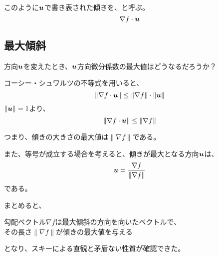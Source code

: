 \documentclass[../../../topic_calculus]{subfiles}
\begin{document}
\br

このように$\vb*{u}$で書き表された傾きを、と呼ぶ。
\begin{equation*}
  \nabla f \cdot \vb*{u}
\end{equation*}

\subsection{最大傾斜}

方向$\vb*{u}$を変えたとき、$\vb*{u}$方向微分係数の最大値はどうなるだろうか？

\br

コーシー・シュワルツの不等式を用いると、
\begin{equation*}
  \| \nabla f \cdot \vb*{u} \| \leq \| \nabla f \| \cdot \| \vb*{u} \|
\end{equation*}
$\| \vb*{u} \| = 1$より、
\begin{equation*}
  \| \nabla f \cdot \vb*{u} \| \leq \| \nabla f \|
\end{equation*}

\br

つまり、傾きの大きさの最大値は$\| \nabla f \|$である。

また、等号が成立する場合を考えると、傾きが最大となる方向$\vb*{u}$は、
\begin{equation*}
  \vb*{u} = \frac{\nabla f}{\| \nabla f \|}
\end{equation*}
である。

\br

まとめると、
\begin{emphabox}
  \begin{spacebox}
    \begin{center}
      勾配ベクトル$\nabla f$は最大傾斜の方向を向いたベクトルで、\\
      その長さ$\| \nabla f \|$が傾きの最大値を与える
    \end{center}
  \end{spacebox}
\end{emphabox}
となり、スキーによる直観と矛盾ない性質が確認できた。
\end{document}

